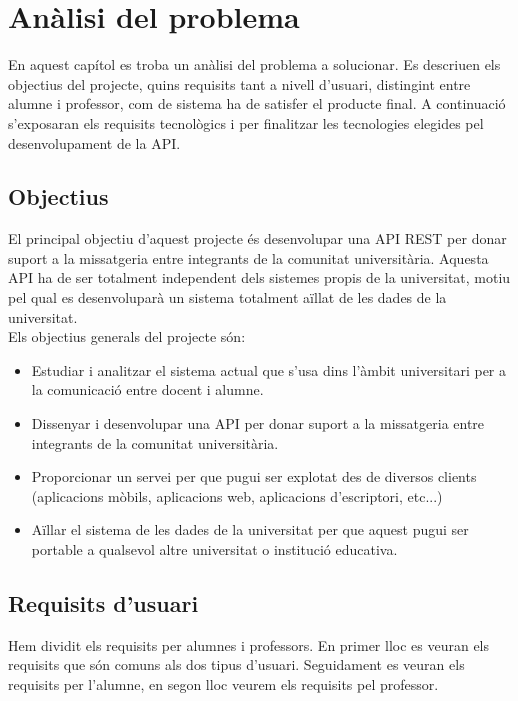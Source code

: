 
\chapter{Anàlisi del problema}\label{analisi}
En aquest capítol es troba un anàlisi del problema a solucionar. Es descriuen els objectius del projecte, quins requisits tant a nivell d'usuari, distingint entre alumne i professor, com de sistema ha de satisfer el producte final. A continuació s'exposaran els requisits tecnològics i per finalitzar les tecnologies elegides pel desenvolupament de la \ac{API}.

\section{Objectius} \label{objectius}

El principal objectiu d'aquest projecte és desenvolupar una \ac{API} \ac{REST} per donar suport a la missatgeria entre integrants de la comunitat universitària. Aquesta \ac{API} ha de ser totalment independent dels sistemes propis de la universitat, motiu pel qual es desenvoluparà un sistema totalment aïllat de les dades de la universitat. \\

Els objectius generals del projecte són:
\begin{itemize}
	\item Estudiar i analitzar el sistema actual que s'usa dins l'àmbit universitari per a la comunicació entre docent i alumne.
	\item Dissenyar i desenvolupar una \ac{API} per donar suport a la missatgeria entre integrants de la comunitat universitària.
	\item Proporcionar un servei per que pugui ser explotat des de diversos clients (aplicacions mòbils, aplicacions web, aplicacions d'escriptori, etc...)
	\item Aïllar el sistema de les dades de la universitat per que aquest pugui ser portable a qualsevol altre universitat o institució educativa.
\end{itemize}
\section{Requisits d'usuari}
Hem dividit els requisits per alumnes i professors. En primer lloc es veuran els requisits que són comuns als dos tipus d'usuari. Seguidament es veuran els requisits per l'alumne, en segon lloc veurem els requisits pel professor.


